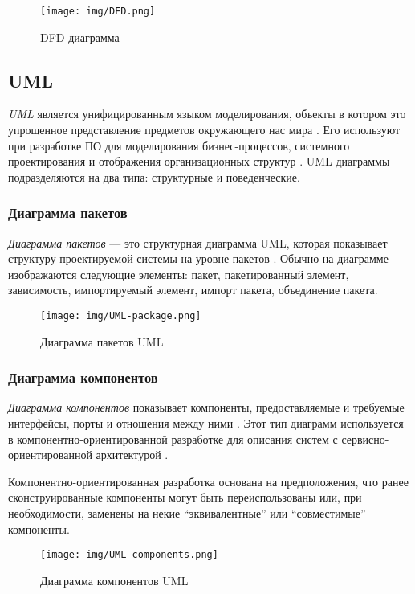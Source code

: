 \documentclass[14pt,russian]{extarticle}
\newcommand*\term[1]{\textit{#1}}
\begin{document}
\begin{figure}[H]
	\centering
	\texttt{[image: img/DFD.png]}
	\caption{DFD диаграмма}
\end{figure}

\subsection{UML}

\term{UML} является унифицированным языком моделирования, объекты в котором это
упрощенное представление предметов окружающего нас мира \cite{hunt}. Его используют при
разработке ПО для моделирования бизнес-процессов, системного проектирования и
отображения организационных структур \cite{fowler}. UML диаграммы подразделяются на два типа:
структурные и поведенческие.

\subsubsection{Диаграмма пакетов}

\term{Диаграмма пакетов} --- это структурная диаграмма UML, которая показывает
структуру проектируемой системы на уровне пакетов \cite{martin}. Обычно на диаграмме
изображаются следующие элементы: пакет, пакетированный элемент, зависимость,
импортируемый элемент, импорт пакета, объединение пакета.

\begin{figure}[H]
	\centering
	\texttt{[image: img/UML-package.png]}
	\caption{Диаграмма пакетов UML}
\end{figure}

\subsubsection{Диаграмма компонентов}

\term{Диаграмма компонентов} показывает компоненты, предоставляемые и требуемые
интерфейсы, порты и отношения между ними \cite{buch}. Этот тип диаграмм используется в
компонентно-ориентированной разработке для описания систем с
сервисно-ориентированной архитектурой \cite{douglass}.

Компонентно-ориентированная разработка основана на предположения, что ранее
сконструированные компоненты могут быть переиспользованы или, при необходимости,
заменены на некие ``эквивалентные'' или ``совместимые'' компоненты.

\begin{figure}[H]
	\centering
	\texttt{[image: img/UML-components.png]}
	\caption{Диаграмма компонентов UML}
\end{figure}
\end{document}
